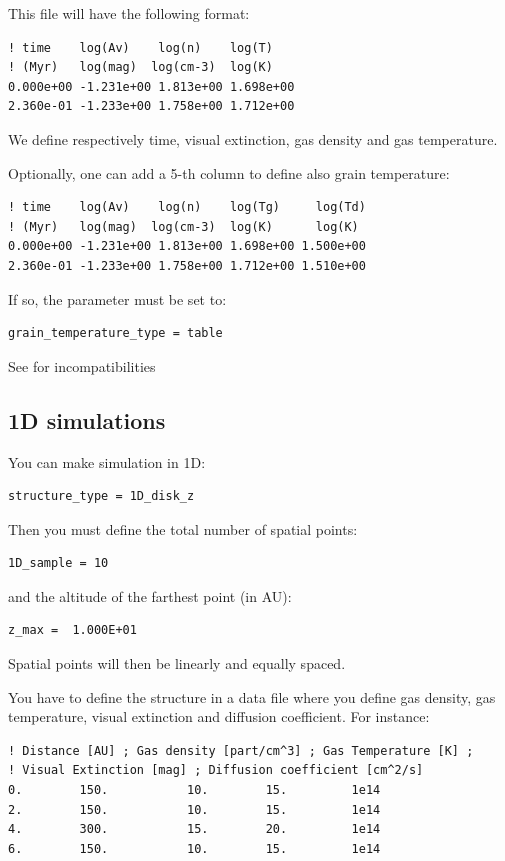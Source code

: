 \documentclass[english,a4paper,twoside]{article}
\begin{document}
This file will have the following format:
\begin{verbatim}
! time    log(Av)    log(n)    log(T)
! (Myr)   log(mag)  log(cm-3)  log(K)
0.000e+00 -1.231e+00 1.813e+00 1.698e+00
2.360e-01 -1.233e+00 1.758e+00 1.712e+00
\end{verbatim}
We define respectively time, visual extinction, gas density and gas temperature. 

Optionally, one can add a 5-th column to define also grain temperature:
\begin{verbatim}
! time    log(Av)    log(n)    log(Tg)     log(Td)
! (Myr)   log(mag)  log(cm-3)  log(K)      log(K)
0.000e+00 -1.231e+00 1.813e+00 1.698e+00 1.500e+00
2.360e-01 -1.233e+00 1.758e+00 1.712e+00 1.510e+00
\end{verbatim}
If so, the parameter  must be set to:
\begin{verbatim}
grain_temperature_type = table
\end{verbatim}

\begin{attention}
See  for incompatibilities
\end{attention}

\subsection{1D simulations}\label{sec:1D}
You can make simulation in 1D:
\begin{verbatim}
structure_type = 1D_disk_z
\end{verbatim}

Then you must define the total number of spatial points:
\begin{verbatim}
1D_sample = 10
\end{verbatim}
and the altitude of the farthest point (in AU):
\begin{verbatim}
z_max =  1.000E+01
\end{verbatim}

Spatial points will then be linearly and equally spaced. 

You have to define the structure in a data file  where you define gas density, gas temperature, visual extinction and diffusion coefficient. For instance:
\begin{verbatim}
! Distance [AU] ; Gas density [part/cm^3] ; Gas Temperature [K] ; 
! Visual Extinction [mag] ; Diffusion coefficient [cm^2/s]
0.        150.           10.        15.         1e14
2.        150.           10.        15.         1e14
4.        300.           15.        20.         1e14
6.        150.           10.        15.         1e14
\end{verbatim}
\end{document}
